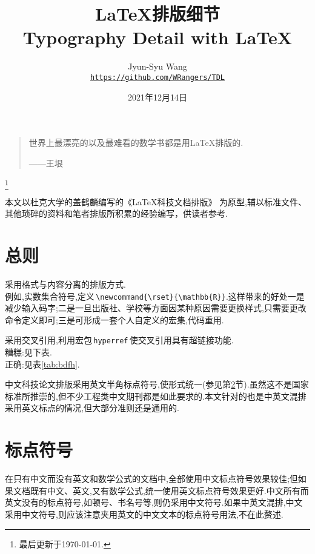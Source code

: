 \documentclass[a4paper]{article}
\title{{\fontspec{Palatino}\LaTeX{}}{\CJKfontspec{方正小标宋简体}排版细节}\\%
\fontspec{Palatino}Typography Detail with \LaTeX}
\author{{\small\fontspec{Zapfino}Jyun-Syu Wang}\\%
\href{https://github.com/WRangers/TDL}{\texttt{https://github.com/WRangers/TDL}}}
\date{2021年12月14日}
\newcommand{\sref}[1]{\CJKecglue\ref{#1}}
\newcommand{\dref}[1]{\CJKecglue\ref{#1}\CJKecglue}
\newcommand{\scite}[1]{\CJKecglue\cite{#1}}
\begin{document}
\maketitle

\begin{quote}
	世界上最漂亮的以及最难看的数学书都是用\LaTeX{}排版的.\eop

	\hfill ——王垠
\end{quote}
\renewcommand\thefootnote{}
\footnote{最后更新于\today\!.\eop}
\setcounter{footnote}{0}
\renewcommand\thefootnote{\arabic{footnote}}

本文以杜克大学的盖鹤麟编写的《\LaTeX{}科技文档排版》\cite{2} 为原型,辅以标准文件、其他琐碎的资料和笔者排版所积累的经验编写，供读者参考.\eop

\section{总则}
\begin{compactitem}[\hspace{1.02em}$\bullet$]
	\item 采用格式与内容分离的排版方式.\\
	例如,实数集合符号,定义\,\verb|\newcommand{\rset}{\mathbb{R}}|.这样带来的好处一是减少输入码字;二是一旦出版社、学校等方面因某种原因需要更换样式,只需要更改命令定义即可;三是可形成一套个人自定义的宏集,代码重用.
	\item 采用交叉引用,利用宏包\,\verb|hyperref|\,使交叉引用具有超链接功能.\\
	\textsf{糟糕}:见下表.\\
	\textsf{正确}:见表\sref{tab:bdfh}.
	\item 中文科技论文排版采用英文半角标点符号,使形式统一(参见第\dref{sec:bdfh}节).虽然这不是国家标准所推崇的,但不少工程类中文期刊都是如此要求的.本文针对的也是中英文混排采用英文标点的情况,但大部分准则还是通用的.\eop
\end{compactitem}

\section{标点符号}\label{sec:bdfh}
在只有中文而没有英文和数学公式的文档中,全部使用中文标点符号效果较佳;但如果文档既有中文、英文,又有数学公式,统一使用英文标点符号效果更好.中文所有而英文没有的标点符号,如顿号、书名号等,则仍采用中文符号.如果中英文混排,中文采用中文符号,则应该注意夹用英文的中文文本的标点符号用法\scite{4},不在此赘述.\eop
\end{document}
